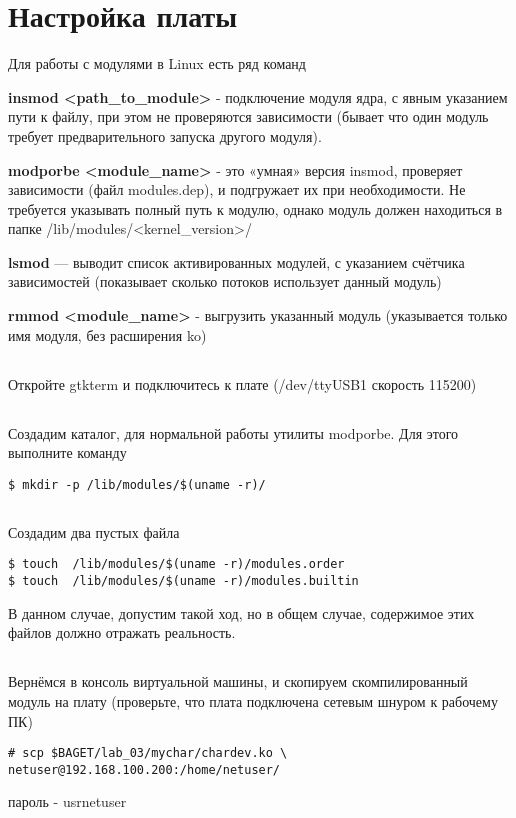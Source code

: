 \section{Настройка платы}
Для работы с модулями в Linux есть ряд команд

\textbf{insmod <path\_to\_module>} - подключение модуля ядра, с явным указанием пути к файлу, при этом не проверяются зависимости (бывает что один модуль требует предварительного запуска другого модуля).

\textbf{modporbe <module\_name>} - это «умная» версия insmod, проверяет зависимости (файл modules.dep), и подгружает их при необходимости. Не требуется указывать полный путь к модулю, однако модуль должен находиться в папке  /lib/modules/<kernel\_version>/

\textbf{lsmod} — выводит список активированных модулей, с указанием счётчика зависимостей (показывает сколько потоков использует данный модуль)

\textbf{rmmod <module\_name>} - выгрузить указанный модуль (указывается только имя модуля, без расширения ko)

\subsection{}Откройте gtkterm и подключитесь к плате (/dev/ttyUSB1 скорость 115200)

\subsection{}Создадим каталог, для нормальной работы утилиты modporbe. Для этого выполните команду
\begin{lstlisting}[style=bash]
$ mkdir -p /lib/modules/$(uname -r)/
\end{lstlisting}

\subsection{}Создадим два пустых файла
\begin{lstlisting}[style=bash]
$ touch  /lib/modules/$(uname -r)/modules.order
$ touch  /lib/modules/$(uname -r)/modules.builtin
\end{lstlisting}
В данном случае, допустим такой ход, но в общем случае, содержимое этих файлов должно отражать реальность.

\subsection{}Вернёмся в консоль виртуальной машины, и скопируем скомпилированный модуль на плату (проверьте, что плата подключена сетевым шнуром к рабочему ПК)
\begin{lstlisting}[style=bash]
# scp $BAGET/lab_03/mychar/chardev.ko \
netuser@192.168.100.200:/home/netuser/
\end{lstlisting}
пароль - usrnetuser

